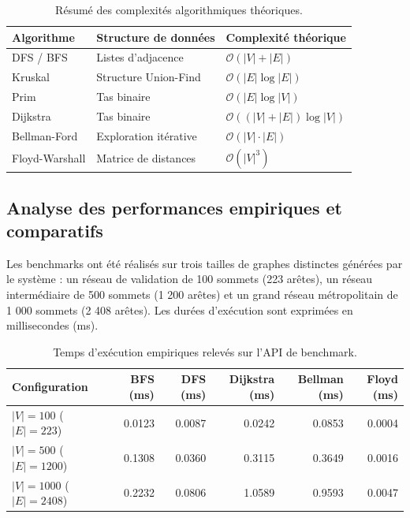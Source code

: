 \begin{table}[h]
    \centering
    \begin{tabular}{lll}
        \toprule
        \textbf{Algorithme} & \textbf{Structure de données} & \textbf{Complexité théorique} \\
        \midrule
        DFS / BFS & Listes d'adjacence & $\mathcal{O}(|V| + |E|)$ \\
        Kruskal & Structure Union-Find & $\mathcal{O}(|E| \log |E|)$ \\
        Prim & Tas binaire & $\mathcal{O}(|E| \log |V|)$ \\
        Dijkstra & Tas binaire & $\mathcal{O}((|V| + |E|) \log |V|)$ \\
        Bellman-Ford & Exploration itérative & $\mathcal{O}(|V| \cdot |E|)$ \\
        Floyd-Warshall & Matrice de distances & $\mathcal{O}(|V|^3)$ \\
        \bottomrule
    \end{tabular}
    \caption{Résumé des complexités algorithmiques théoriques.}
    \label{tab:complexites}
\end{table}

\subsection{Analyse des performances empiriques et comparatifs}
Les benchmarks ont été réalisés sur trois tailles de graphes distinctes générées par le système : un réseau de validation de 100 sommets (223 arêtes), un réseau intermédiaire de 500 sommets (1 200 arêtes) et un grand réseau métropolitain de 1 000 sommets (2 408 arêtes). Les durées d'exécution sont exprimées en millisecondes (ms).

\begin{table}[h]
    \centering
    \begin{tabular}{lrrrrr}
        \toprule
        \textbf{Configuration} & \textbf{BFS (ms)} & \textbf{DFS (ms)} & \textbf{Dijkstra (ms)} & \textbf{Bellman (ms)} & \textbf{Floyd (ms)} \\
        \midrule
        $|V|=100$ ($|E|=223$)   & 0.0123 & 0.0087 & 0.0242 & 0.0853 & 0.0004 \\
        $|V|=500$ ($|E|=1200$)  & 0.1308 & 0.0360 & 0.3115 & 0.3649 & 0.0016 \\
        $|V|=1000$ ($|E|=2408$) & 0.2232 & 0.0806 & 1.0589 & 0.9593 & 0.0047    \\
        \bottomrule
    \end{tabular}
    \caption{Temps d'exécution empiriques relevés sur l'API de benchmark.}
    \label{tab:benchmarks_empiriques}
\end{table}


